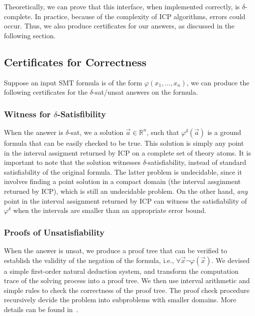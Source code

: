\documentclass[envcountsect]{llncs}
\begin{document}
Theoretically, we can prove that this interface, when implemented correctly, is
$\delta$-complete. In practice, because of the complexity of ICP algorithms,
errors could occur. Thus, we also produce certificates for our answers, as
discussed in the following section. 

\subsection{Certificates for Correctness}

Suppose an input SMT formula is of the form $\varphi(x_1,...,x_n)$, we can
produce the following certificates for the {\sf $\delta$-sat/unsat} answers on
the formula. 

\subsubsection{Witness for $\delta$-Satisfibility} When the answer is
{\sf $\delta$-sat}, we a solution $\vec a\in \mathbb{R}^n$, such
that $\varphi^{\delta}(\vec a)$ is a ground formula that can be easily checked
to be true. This solution is simply any point in the interval assigment returned
by ICP on a complete set of theory atoms. It is important to note that the
solution witnesses $\delta$-satisfiability, instead of standard satisfiability
of the original formula. The latter problem is undecidable, since it involves
finding a point solution in a compact domain (the interval assginment returned
by ICP), which is still an undecidable problem. On the other hand, {\em any}
point in the interval assignment returned by ICP can witness the satisfiability
of $\varphi^{\delta}$ when the intervals are smaller than an appropriate error
bound. 

\subsubsection{Proofs of Unsatisfiability} When the answer is {\sf unsat}, we
produce a proof tree that can be verified to establish the validity of the
negation of the formula, i.e., $\forall \vec x \neg\varphi(\vec x)$. We
devised a simple first-order natural deduction system, and transform the
computation trace of the solving process into a proof tree. We then use
interval arithmetic and simple rules to check the correctness of the proof
tree. The proof check procedure recursively devide the problem into subproblems
with smaller domains. More details can be found in~\cite{}. 
\end{document}
